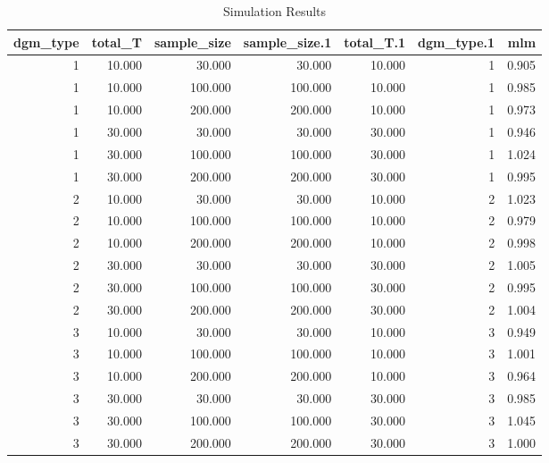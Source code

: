 \begin{table}[ht]
\centering
\begin{tabular}{rrrrrrr}
  \hline
dgm\_type & total\_T & sample\_size & sample\_size.1 & total\_T.1 & dgm\_type.1 & mlm \\ 
  \hline
   1 & 10.000 & 30.000 & 30.000 & 10.000 &    1 & 0.905 \\ 
     1 & 10.000 & 100.000 & 100.000 & 10.000 &    1 & 0.985 \\ 
     1 & 10.000 & 200.000 & 200.000 & 10.000 &    1 & 0.973 \\ 
     1 & 30.000 & 30.000 & 30.000 & 30.000 &    1 & 0.946 \\ 
     1 & 30.000 & 100.000 & 100.000 & 30.000 &    1 & 1.024 \\ 
     1 & 30.000 & 200.000 & 200.000 & 30.000 &    1 & 0.995 \\ 
     2 & 10.000 & 30.000 & 30.000 & 10.000 &    2 & 1.023 \\ 
     2 & 10.000 & 100.000 & 100.000 & 10.000 &    2 & 0.979 \\ 
     2 & 10.000 & 200.000 & 200.000 & 10.000 &    2 & 0.998 \\ 
     2 & 30.000 & 30.000 & 30.000 & 30.000 &    2 & 1.005 \\ 
     2 & 30.000 & 100.000 & 100.000 & 30.000 &    2 & 0.995 \\ 
     2 & 30.000 & 200.000 & 200.000 & 30.000 &    2 & 1.004 \\ 
     3 & 10.000 & 30.000 & 30.000 & 10.000 &    3 & 0.949 \\ 
     3 & 10.000 & 100.000 & 100.000 & 10.000 &    3 & 1.001 \\ 
     3 & 10.000 & 200.000 & 200.000 & 10.000 &    3 & 0.964 \\ 
     3 & 30.000 & 30.000 & 30.000 & 30.000 &    3 & 0.985 \\ 
     3 & 30.000 & 100.000 & 100.000 & 30.000 &    3 & 1.045 \\ 
     3 & 30.000 & 200.000 & 200.000 & 30.000 &    3 & 1.000 \\ 
   \hline
\end{tabular}
\caption{Simulation Results} 
\label{tab:sim_results}
\end{table}

